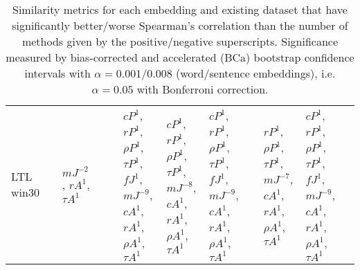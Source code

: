 \documentclass[letterpaper]{article} %
\begin{document}
\begin{sidewaystable*}
\begin{tabular}{l l l l l l l l l l l l}
\multirow{6}{1.5cm}{LTL win30} & \multirow{6}{1.5cm}{} & \multirow{6}{1.5cm}{$mJ^{-2}$, $r A^{1}$, $\tau A^{1}$} & \multirow{6}{1.5cm}{} & \multirow{6}{1.5cm}{} & \multirow{6}{1.5cm}{$cP^{1}$, $r P^{1}$, $\rho P^{1}$, $\tau P^{1}$, $fJ^{1}$, $mJ^{-9}$, $cA^{1}$, $r A^{1}$, $\rho A^{1}$, $\tau A^{1}$} & \multirow{6}{1.5cm}{$cP^{1}$, $r P^{1}$, $\rho P^{1}$, $\tau P^{1}$, $mJ^{-8}$, $cA^{1}$, $r A^{1}$, $\rho A^{1}$, $\tau A^{1}$} & \multirow{6}{1.5cm}{$cP^{1}$, $r P^{1}$, $\rho P^{1}$, $\tau P^{1}$, $fJ^{1}$, $mJ^{-9}$, $cA^{1}$, $r A^{1}$, $\rho A^{1}$, $\tau A^{1}$} & \multirow{6}{1.5cm}{} & \multirow{6}{1.5cm}{$r P^{1}$, $\rho P^{1}$, $\tau P^{1}$, $mJ^{-7}$, $cA^{1}$, $r A^{1}$, $\rho A^{1}$, $\tau A^{1}$} & \multirow{6}{1.5cm}{$cP^{1}$, $r P^{1}$, $\rho P^{1}$, $\tau P^{1}$, $fJ^{1}$, $mJ^{-9}$, $cA^{1}$, $r A^{1}$, $\rho A^{1}$, $\tau A^{1}$} & \multirow{6}{1.5cm}{} \\ \\ \\ \\ \\ \\
\bottomrule
    \end{tabular}
\caption{Similarity metrics for each embedding and existing dataset that have significantly better/worse Spearman's correlation than the number of methods given by the positive/negative superscripts. Significance measured by bias-corrected and accelerated (BCa)
bootstrap confidence intervals with $\alpha = 0.001$/$0.008$ (word/sentence embeddings), i.e. $\alpha = 0.05$ with Bonferroni correction. }
    \label{tab:significance_existingDatasets_methods1} 
\end{sidewaystable*}
\end{document}
